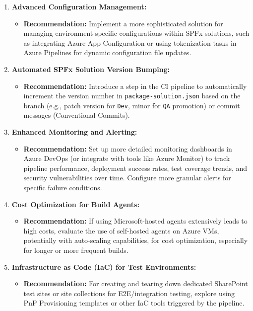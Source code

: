 \begin{enumerate}
\begin{itemize}
    \end{itemize}
    \item \textbf{Advanced Configuration Management:}
    \begin{itemize}
        \item \textbf{Recommendation:} Implement a more sophisticated solution for managing environment-specific configurations within SPFx solutions, such as integrating Azure App Configuration or using tokenization tasks in Azure Pipelines for dynamic configuration file updates.
    \end{itemize}
    \item \textbf{Automated SPFx Solution Version Bumping:}
    \begin{itemize}
        \item \textbf{Recommendation:} Introduce a step in the CI pipeline to automatically increment the version number in \texttt{package-solution.json} based on the branch (e.g., patch version for \texttt{Dev}, minor for \texttt{QA} promotion) or commit messages (Conventional Commits).
    \end{itemize}
    \item \textbf{Enhanced Monitoring and Alerting:}
    \begin{itemize}
        \item \textbf{Recommendation:} Set up more detailed monitoring dashboards in Azure DevOps (or integrate with tools like Azure Monitor) to track pipeline performance, deployment success rates, test coverage trends, and security vulnerabilities over time. Configure more granular alerts for specific failure conditions.
    \end{itemize}
    \item \textbf{Cost Optimization for Build Agents:}
    \begin{itemize}
        \item \textbf{Recommendation:} If using Microsoft-hosted agents extensively leads to high costs, evaluate the use of self-hosted agents on Azure VMs, potentially with auto-scaling capabilities, for cost optimization, especially for longer or more frequent builds.
    \end{itemize}
    \item \textbf{Infrastructure as Code (IaC) for Test Environments:}
    \begin{itemize}
        \item \textbf{Recommendation:} For creating and tearing down dedicated SharePoint test sites or site collections for E2E/integration testing, explore using PnP Provisioning templates or other IaC tools triggered by the pipeline.

\end{itemize}
\end{enumerate}

